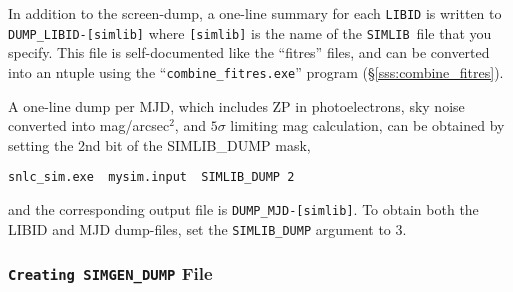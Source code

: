 \documentclass[12pt]{article}
\newcommand{\simlib}{{\tt SIMLIB}}
\begin{document}
In addition to the screen-dump, a one-line summary for each 
{\tt LIBID} is written to {\tt DUMP\_LIBID-[simlib]} where
{\tt [simlib]} is the name of the \simlib\ file that you
specify.
This file is self-documented like the ``fitres'' files,
and can be converted into an ntuple using the
``{\tt combine\_fitres.exe}'' program (\S\ref{sss:combine_fitres}).


A one-line dump per MJD, which includes ZP in photoelectrons,
sky noise converted into mag/arcsec$^2$, and $5\sigma$ limiting
mag calculation, can be obtained by setting the 2nd bit
of the SIMLIB\_DUMP mask,
%
\begin{Verbatim}[frame=single]
    snlc_sim.exe  mysim.input  SIMLIB_DUMP 2
\end{Verbatim}
and the corresponding output file is 
{\tt DUMP\_MJD-[simlib]}. To obtain both the LIBID and MJD
dump-files, set the {\tt SIMLIB\_DUMP} argument to 3.





   \subsubsection{{\tt Creating SIMGEN\_DUMP} File }
   \label{sss:simgen_dump}
\end{document}
